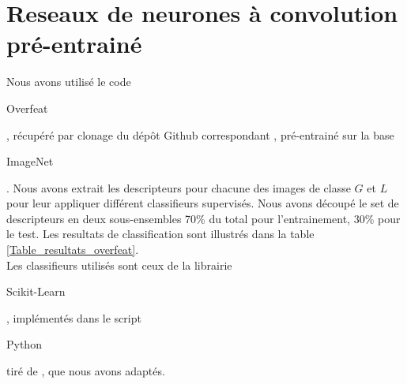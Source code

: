 \documentclass{book}
\begin{document}
\section{Reseaux de neurones à convolution pré-entrainé}
Nous avons utilisé le code \begin{itshape}Overfeat\end{itshape} \cite{DBLP:journals/corr/SermanetEZMFL13}, récupéré par clonage du dépôt 
Github correspondant \cite{overfeat}, pré-entrainé sur la base \begin{itshape}ImageNet\end{itshape} \cite{imagenet_cvpr09}.
Nous avons extrait les descripteurs pour chacune des images de classe $G$ et $L$ pour leur appliquer différent classifieurs
 supervisés. Nous avons découpé le set de descripteurs en deux sous-ensembles 70\% du total pour l'entrainement, 30\% pour le test.
 Les resultats de classification sont illustrés dans la table \ref{Table_resultats_overfeat}.\\
 Les classifieurs utilisés sont ceux de la librairie \begin{itshape}Scikit-Learn\end{itshape}, implémentés dans le script 
\begin{itshape}Python\end{itshape} tiré de \cite{scikit_bench}, que nous avons adaptés.
\end{document}

